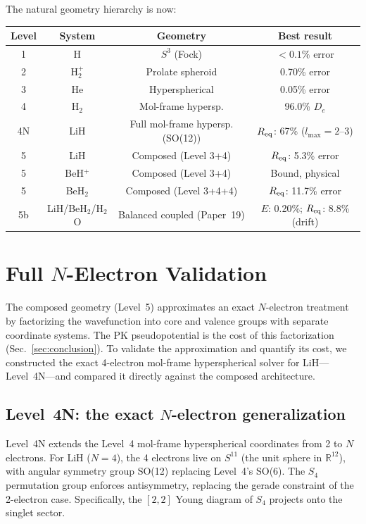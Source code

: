 \documentclass[aps,pra,twocolumn,superscriptaddress,longbibliography,floatfix]{revtex4-2}
\begin{document}
The natural geometry hierarchy is now:
\begin{center}
\begin{tabular}{cccc}
\toprule
Level & System & Geometry & Best result \\
\midrule
1 & H       & $S^3$ (Fock)           & $<0.1\%$ error \\
2 & H$_2^+$ & Prolate spheroid       & 0.70\% error \\
3 & He      & Hyperspherical         & 0.05\% error \\
4 & H$_2$   & Mol-frame hypersp.     & 96.0\% $D_e$ \\
4N & LiH    & Full mol-frame hypersp. (SO(12)) & $R_{\rm eq}$: 67\% ($l_{\max} = 2$--3) \\
5 & LiH     & Composed (Level 3+4)   & $R_{\rm eq}$: 5.3\% error \\
5 & BeH$^+$ & Composed (Level 3+4)   & Bound, physical \\
5 & BeH$_2$ & Composed (Level 3+4+4) & $R_{\rm eq}$: 11.7\% error \\
5b & LiH/BeH$_2$/H$_2$O & Balanced coupled (Paper~19) & $E$: 0.20\%; $R_{\rm eq}$: 8.8\% (drift) \\
\bottomrule
\end{tabular}
\end{center}


\section{Full $N$-Electron Validation}
\label{sec:n_electron}

The composed geometry (Level~5) approximates an exact $N$-electron
treatment by factorizing the wavefunction into core and valence groups
with separate coordinate systems.  The PK pseudopotential is the cost
of this factorization (Sec.~\ref{sec:conclusion}).  To validate the
approximation and quantify its cost, we constructed the exact
4-electron mol-frame hyperspherical solver for LiH---Level~4N---and
compared it directly against the composed architecture.

\subsection{Level~4N: the exact $N$-electron generalization}

Level~4N extends the Level~4 mol-frame hyperspherical coordinates
from 2 to $N$ electrons.  For LiH ($N=4$), the 4 electrons live on
$S^{11}$ (the unit sphere in $\mathbb{R}^{12}$), with angular
symmetry group SO(12) replacing Level~4's SO(6).  The $S_4$ permutation
group enforces antisymmetry, replacing the gerade constraint of the
2-electron case.  Specifically, the $[2,2]$ Young diagram of $S_4$
projects onto the singlet sector.
\end{document}
